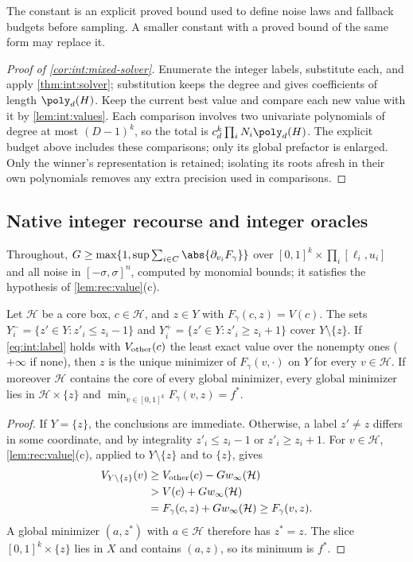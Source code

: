 The constant is an explicit proved bound used to define noise laws and fallback
budgets before sampling. A smaller constant with a proved bound of the same form
may replace it.

\begin{proof}[Proof of \cref{cor:int:mixed-solver}]
Enumerate the integer labels, substitute each, and apply \cref{thm:int:solver};
substitution keeps the degree and gives coefficients of length $\poly_d(H)$.
Keep the current best value and compare each new value with it by
\cref{lem:int:values}. Each comparison involves two univariate polynomials of
degree at most $(D-1)^k$, so the total is $c_d^k\prod_iN_i\poly_d(H)$.
The explicit budget above includes these comparisons; only its global
prefactor is enlarged. Only the winner's
representation is retained; isolating its roots afresh in their own polynomials
removes any extra precision used in comparisons.
\end{proof}

\subsection{Native integer recourse and integer oracles}\label{app:int:native}

Throughout, $G\ge\max\{1,\sup\sum_{i\in C}\abs{\partial_{v_i}F_\gamma}\}$ over
$[0,1]^k\times\prod_i[\ell_i,u_i]$ and all noise in $[-\sigma,\sigma]^n$, computed
by monomial bounds; it satisfies the hypothesis of \cref{lem:rec:value}(c).

\begin{lemma}\label{lem:int:label}
Let $\mathcal H$ be a core box, $c\in\mathcal H$, and $z\in Y$ with
$F_\gamma(c,z)=V(c)$. The sets $Y_i^-=\{z'\in Y:z'_i\le z_i-1\}$ and
$Y_i^+=\{z'\in Y:z'_i\ge z_i+1\}$ cover $Y\setminus\{z\}$. If
\eqref{eq:int:label} holds with $V_{\rm other}(c)$ the least exact value over
the nonempty ones ($+\infty$ if none), then $z$ is the unique minimizer of
$F_\gamma(v,\cdot)$ on $Y$ for every $v\in\mathcal H$. If moreover $\mathcal H$
contains the core of every global minimizer, every global minimizer lies in
$\mathcal H\times\{z\}$ and $\min_{v\in[0,1]^k}F_\gamma(v,z)=f^*$.
\end{lemma}

\begin{proof}
If $Y=\{z\}$, the conclusions are immediate. Otherwise,
a label $z'\ne z$ differs in some coordinate, and by integrality $z'_i\le z_i-1$
or $z'_i\ge z_i+1$. For $v\in\mathcal H$, \cref{lem:rec:value}(c), applied to
$Y\setminus\{z\}$ and to $\{z\}$, gives
\begin{align*}
 V_{Y\setminus\{z\}}(v)&\ge V_{\rm other}(c)-Gw_\infty(\mathcal H)\\
 &>V(c)+Gw_\infty(\mathcal H)\\
 &=F_\gamma(c,z)+Gw_\infty(\mathcal H)\ge F_\gamma(v,z).
\end{align*}
A global minimizer $(a,z^*)$
with $a\in\mathcal H$ therefore has $z^*=z$. The slice
$[0,1]^k\times\{z\}$ lies in $X$ and contains $(a,z)$, so its minimum is $f^*$.
\end{proof}

